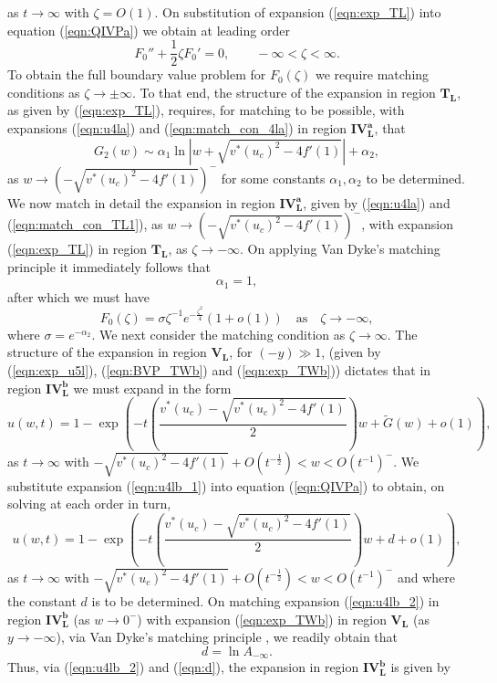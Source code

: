 \documentclass[11pt,a4paper]{article}
\newcommand{\eeref}[1]{(\ref{eqn:#1})}
\newcommand{\eelab}[1]{\label{eqn:#1}}
\def\beq{\begin{equation}}
\def\eeq{\end{equation}}
\begin{document}
as $t \to \infty$ with $\zeta=O(1)$. On substitution of expansion \eeref{exp_TL} into equation \eeref{QIVPa} we obtain at leading order 
\beq \eelab{ODE_TL}
F_0'' + \frac{1}{2}\zeta F_0'= 0, \qquad - \infty < \zeta < \infty.
\eeq
To obtain the full boundary value problem for $F_0(\zeta)$ we require matching conditions as $\zeta \to \pm \infty$. To that end, the structure of the expansion in region $\mathbf{T_L}$, as given by \eeref{exp_TL}, requires, for matching to be possible, with expansions \eeref{u4la}  and 
\eeref{match_con_4la} 
in region  $\mathbf{IV_L^a}$, that
\beq \eelab{match_con_TL1}
G_2(w) \sim \alpha_1 \ln \left|  w+\sqrt{v^*(u_c)^2 - 4f'(1)} \right|+ \alpha_2, 
\eeq
as $w \to (-\sqrt{v^*(u_c)^2 - 4f'(1)})^- $ for some   constants $\alpha_1, \alpha_2$ to be determined. We now match in detail the expansion in region $\mathbf{IV_L^a}$, given by \eeref{u4la} and \eeref{match_con_TL1}, as $w \to (-  \sqrt{v^*(u_c)^2 -  4 f'(1)})^-$, with expansion \eeref{exp_TL} in region $\mathbf{T_L}$, as $\zeta \to - \infty$. On applying Van Dyke's matching principle \cite{VanDyke1975} it immediately follows that  
\beq
\alpha_1 = 1,
\eeq
after which we must have 
\beq \eelab{match_con_TL2}
F_0(\zeta) = \sigma \zeta^{-1} e^{- \frac{\zeta^2}{4}} \left(1 + o(1) \right) \quad \mbox{as} \quad \zeta \to - \infty,
\eeq
where $\sigma=e^{-\alpha_2}$. We next consider the matching condition as $\zeta \to \infty$. The structure of the expansion in region $\mathbf{V_L}$, for $(-y) \gg 1$, (given by \eeref{exp_u5l}, \eeref{BVP_TWb}  and \eeref{exp_TWb}) dictates that in region $\mathbf{IV_L^b}$ we must expand in the form
\beq
u(w,t) =  1- \exp \left( -t  \left( \frac{v^*(u_c) - \sqrt{v^*(u_c)^2 - 4f'(1)}}{2} \right) w   +   \tilde{G}(w) + o \left( 1 \right) \right) , \eelab{u4lb_1}
\eeq
as $t \to \infty$ with $-  \sqrt{v^*(u_c)^2 -  4 f'(1)} + O(t^{-\frac{1}{2}}) < w < O(t^{-1})^-$. We substitute expansion \eeref{u4lb_1} into equation \eeref{QIVPa} to obtain, on solving at each order in turn, 
\beq
u(w,t) =  1- \exp \left( -t  \left( \frac{v^*(u_c) - \sqrt{v^*(u_c)^2 - 4f'(1)}}{2} \right) w  + d + o \left(1 \right)  \right), \eelab{u4lb_2}
\eeq
as $t \to \infty$ with  $-  \sqrt{v^*(u_c)^2 -  4 f'(1)} + O(t^{-\frac{1}{2}}) < w < O(t^{-1})^-$ and where the constant $d$ is to be determined. On matching expansion \eeref{u4lb_2} in region $\mathbf{IV_L^b}$ (as $w \to 0^-$) with expansion \eeref{exp_TWb} in region $\mathbf{V_L}$ (as $y \to - \infty$), via Van Dyke's matching principle \cite{VanDyke1975}, we readily obtain that 
\beq \eelab{d}
d=\ln A_{-\infty}.
\eeq
%
 Thus, via \eeref{u4lb_2} and \eeref{d}, the expansion in region $\mathbf{IV_L^b}$ is given by
\end{document}
